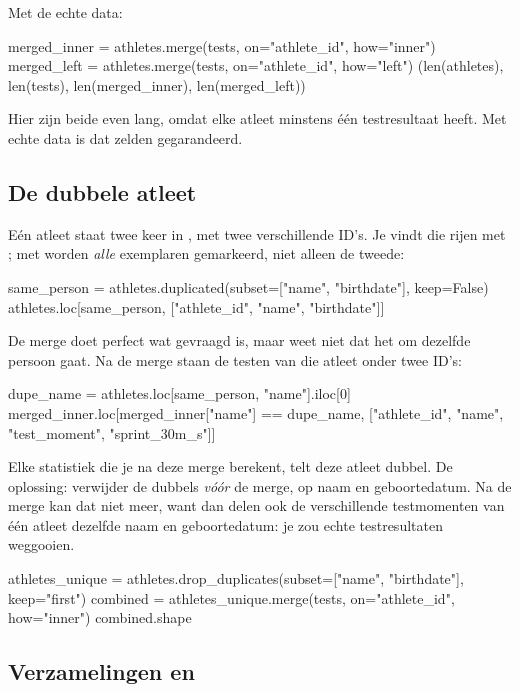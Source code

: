 \documentclass[11pt,a4paper]{article}
\begin{document}
Met de echte data:

\begin{python}
merged_inner = athletes.merge(tests, on="athlete_id", how="inner")
merged_left = athletes.merge(tests, on="athlete_id", how="left")
(len(athletes), len(tests), len(merged_inner), len(merged_left))
\end{python}

Hier zijn beide even lang, omdat elke atleet minstens één testresultaat
heeft. Met echte data is dat zelden gegarandeerd.

\subsection{De dubbele atleet}

Eén atleet staat twee keer in , met twee verschillende
ID's. Je vindt die rijen met ; met 
worden \emph{alle} exemplaren gemarkeerd, niet alleen de tweede:

\begin{python}
same_person = athletes.duplicated(subset=["name", "birthdate"], keep=False)
athletes.loc[same_person, ["athlete_id", "name", "birthdate"]]
\end{python}

De merge doet perfect wat gevraagd is, maar weet niet dat het om dezelfde
persoon gaat. Na de merge staan de testen van die atleet onder twee ID's:

\begin{python}
dupe_name = athletes.loc[same_person, "name"].iloc[0]
merged_inner.loc[merged_inner["name"] == dupe_name,
                 ["athlete_id", "name", "test_moment", "sprint_30m_s"]]
\end{python}

Elke statistiek die je na deze merge berekent, telt deze atleet dubbel.
De oplossing: verwijder de dubbels \emph{vóór} de merge, op naam en
geboortedatum. Na de merge kan dat niet meer, want dan delen ook de
verschillende testmomenten van één atleet dezelfde naam en
geboortedatum: je zou echte testresultaten weggooien.

\begin{python}
athletes_unique = athletes.drop_duplicates(subset=["name", "birthdate"], keep="first")
combined = athletes_unique.merge(tests, on="athlete_id", how="inner")
combined.shape
\end{python}

\subsection{Verzamelingen en }
\end{document}
